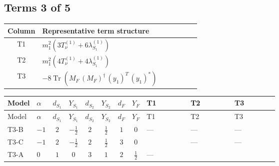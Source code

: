 \documentclass[8pt]{article}
\begin{document}
\begin{landscape}
\subsection*{Terms 3 of 5}
\begin{center}
\begin{tabular}{@{}c >{\raggedright\arraybackslash}p{0.82\linewidth}@{}}
\toprule
Column & Representative term structure \\
\midrule
T1 & \(\displaystyle {m_1^2} (3 T_{\nu}^{(1)}+6 {\lambda_{S_1}^{(1)}})\) \\
\midrule
T2 & \(\displaystyle {m_1^2} (4 T_{\nu}^{(1)}+4 {\lambda_{S_1}^{(1)}})\) \\
\midrule
T3 & \(\displaystyle -8 \operatorname{Tr}\!\left({M_F}\,\left({M_F}\right)^{\dagger}\,\left({y_1}\right)^{T}\,\left({y_1}\right)^{*}\right)\) \\
\midrule
\bottomrule
\end{tabular}
\end{center}
\smallskip
\tiny
\begin{longtable}{@{}llcccccc >{\raggedright\arraybackslash}p{0.21\linewidth} >{\raggedright\arraybackslash}p{0.21\linewidth} >{\raggedright\arraybackslash}p{0.21\linewidth}@{}}
\toprule
Model & $\alpha$ & $d_{S_1}$ & $Y_{S_1}$ & $d_{S_2}$ & $Y_{S_2}$ & $d_F$ & $Y_F$ & T1 & T2 & T3 \\
\midrule
\endfirsthead
\toprule
Model & $\alpha$ & $d_{S_1}$ & $Y_{S_1}$ & $d_{S_2}$ & $Y_{S_2}$ & $d_F$ & $Y_F$ & T1 & T2 & T3 \\
\midrule
\endhead
T3-B & $-1$ & $2$ & $-\frac{1}{2}$ & $2$ & $\frac{1}{2}$ & $1$ & $0$ & --- & --- & --- \\
\midrule
T3-C & $-1$ & $2$ & $-\frac{1}{2}$ & $2$ & $\frac{1}{2}$ & $3$ & $0$ & \scriptsize\adjustbox{max width=\linewidth}{$\begin{gathered} {m_1^2} (3 T_{\nu}^{(1)}+6 {\lambda_{S_1}^{(1)}})\end{gathered}$} & --- & --- \\
\midrule
T3-A & $0$ & $1$ & $0$ & $3$ & $1$ & $2$ & $\frac{1}{2}$ & --- & \scriptsize\adjustbox{max width=\linewidth}{$\begin{gathered} {m_1^2} (4 T_{\nu}^{(1)}+4 {\lambda_{S_1}^{(1)}})\end{gathered}$} & \scriptsize\adjustbox{max width=\linewidth}{$\begin{gathered} -8 \operatorname{Tr}\!\left({M_F}\,\left({M_F}\right)^{\dagger}\,\left({y_1}\right)^{T}\,\left({y_1}\right)^{*}\right)\end{gathered}$} \\

\end{longtable}
\end{landscape}
\end{document}
